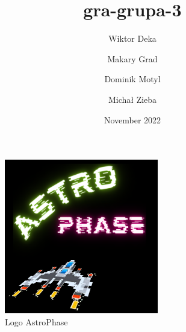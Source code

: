 \documentclass{article}
\title{gra-grupa-3}
\author{Wiktor Deka \and Makary Grad \and Dominik Motyl \and Michał Zieba}
\date{November 2022}
\begin{document}
\maketitle
\begin{figure}[htbp]
    \centering
    \includegraphics[width=0.6\textwidth]{pictures/AstroPhase.png}
    \caption{Logo AstroPhase}
\end{figure}





\end{document}
